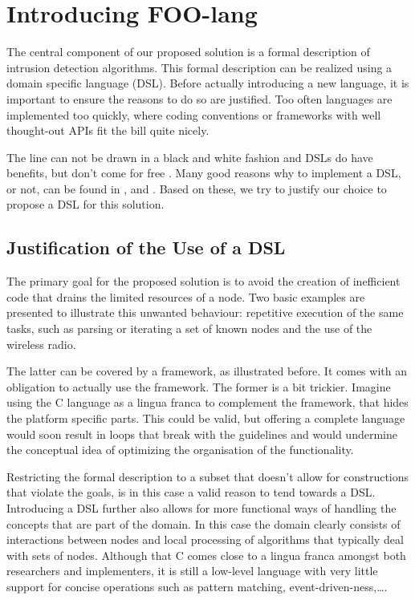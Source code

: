 \documentclass[conference]{IEEEtran}
\begin{document}
\section{Introducing FOO-lang}
\label{section:foo-lang}

The central component of our proposed solution is a formal description of
intrusion detection algorithms. This formal description can be realized using a
domain specific language (DSL). Before actually introducing a new language, it
is important to ensure the reasons to do so are justified. Too often languages
are implemented too quickly, where coding conventions or frameworks with well
thought-out APIs fit the bill quite nicely.

The line can not be drawn in a black and white fashion and DSLs do have
benefits, but don't come for free \cite{mernik2005and}. Many good reasons why
to implement a DSL, or not, can be found in \cite{mernik2005and},
\cite{van2000domain} and \cite{fowler2010domain}. Based on these, we try to
justify our choice to propose a DSL for this solution.

\subsection{Justification of the Use of a DSL}
\label{subsection:justification}

The primary goal for the proposed solution is to avoid the creation of
inefficient code that drains the limited resources of a node. Two basic
examples are presented to illustrate this unwanted behaviour: repetitive
execution of the same tasks, such as parsing or iterating a set of known nodes
and the use of the wireless radio.

The latter can be covered by a framework, as illustrated before. It comes with
an obligation to actually use the framework. The former is a bit trickier.
Imagine using the C language as a lingua franca to complement the framework,
that hides the platform specific parts. This could be valid, but offering a
complete language would soon result in loops that break with the guidelines and
would undermine the conceptual idea of optimizing the organisation of the
functionality.

Restricting the formal description to a subset that doesn't allow for
constructions that violate the goals, is in this case a valid reason to tend
towards a DSL. Introducing a DSL further also allows for more functional ways
of handling the concepts that are part of the domain. In this case the domain
clearly consists of interactions between nodes and local processing of
algorithms that typically deal with sets of nodes. Although that C comes close
to a lingua franca amongst both researchers and implementers, it is still a
low-level language with very little support for concise operations such as
pattern matching, event-driven-ness,\dots.
\end{document}
